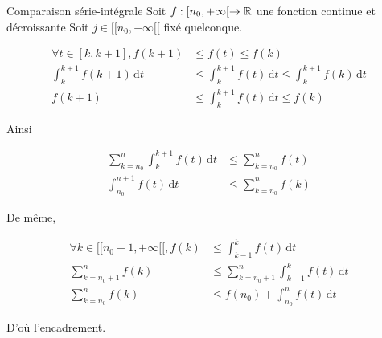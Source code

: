 \documentclass{article}
\renewenvironment{question_kholle}[2][ ]
{
	\subsection{\texorpdfstring{#2}{}}
	\notblank{#1}
	{
		\noindent #1
		\bigbreak
	}
	{}
	\begin{proof}
}
{
	\end{proof}
}
\begin{document}
\begin{question_kholle}{Comparaison série-intégrale}
    Soit $f:[n_{0}, +\infty[ \to \mathbb R$ une fonction continue et décroissante
    Soit $j \in [ \! [ n_{0}, +\infty [\![$ fixé quelconque.
    
    \begin{align*}
        \forall t \in [k, k+1], f(k+1) &\leqslant f(t) \leqslant f(k) \\
        \int_{k}^{k+1} f(k+1) \, \mathrm dt &\leqslant \int_{k}^{k+1} f(t) \, \mathrm dt \leqslant \int_{k}^{k+1}  f(k) \, \mathrm dt  \\
        f(k+1) & \leqslant \int_{k}^{k+1} f(t) \, \mathrm dt \leqslant f(k)
    \end{align*}
    
    Ainsi
    
    \begin{align*}
        \sum_{k=n_{0}}^{n}\int_{k}^{k+1}f(t)  \, \mathrm dt  & \leqslant \sum_{k=n_{0}}^{n}f(t) \\
        \int_{n_{0}}^{n+1} f(t) \, \mathrm dt & \leqslant \sum_{k=n_{0}}^{n}f(k)
    \end{align*}
    
    
    De même,
    
    \begin{align*}
        \forall k \in [ \! [ n_{0}+1 , +\infty[ \![, f(k) & \leqslant\int_{k-1}^{k} f(t) \, \mathrm dt  \\
        \sum_{k=n_{0}+1}^{n}f(k)  & \leqslant \sum_{k=n_{0}+1}^{n}\int_{k-1}^{k} f(t) \, \mathrm dt \\
        \sum_{k=n_{0}}^{n} f(k)&\leqslant f(n_{0})+ \int_{n_{0}}^{n} f(t) \, \mathrm dt 
    \end{align*}
    
    D'où l'encadrement.
\end{question_kholle}
\end{document}
